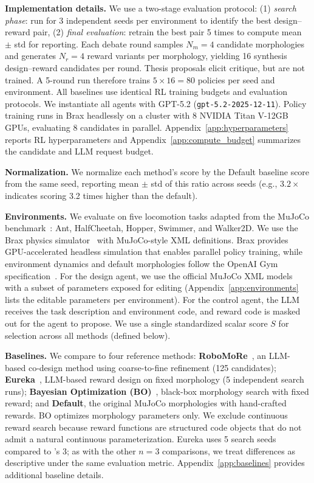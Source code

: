 \textbf{Implementation details.} We use a two-stage evaluation protocol: (1) \emph{search phase}: run \abbrev{} for 3 independent seeds per environment to identify the best design--reward pair, (2) \emph{final evaluation}: retrain the best pair 5 times to compute mean $\pm$ std for reporting. Each debate round samples $N_m{=}4$ candidate morphologies and generates $N_r{=}4$ reward variants per morphology, yielding 16 synthesis design--reward candidates per round. Thesis proposals elicit critique, but are not trained. A 5-round run therefore trains $5 \times 16 = 80$ policies per seed and environment. All baselines use identical RL training budgets and evaluation protocols. We instantiate all agents with GPT-5.2 (\texttt{gpt-5.2-2025-12-11}). Policy training runs in Brax headlessly on a cluster with 8 NVIDIA Titan V-12GB GPUs, evaluating 8 candidates in parallel. Appendix~\ref{app:hyperparameters} reports RL hyperparameters and Appendix~\ref{app:compute_budget} summarizes the candidate and LLM request budget.

\textbf{Normalization.} We normalize each method's score by the Default baseline score from the same seed, reporting mean $\pm$ std of this ratio across seeds (e.g., $3.2\times$ indicates scoring 3.2 times higher than the default).

\textbf{Environments.} We evaluate on five locomotion tasks adapted from the MuJoCo benchmark~\cite{todorov2012mujoco}: Ant, HalfCheetah, Hopper, Swimmer, and Walker2D. We use the Brax physics simulator~\cite{brax2021github} with MuJoCo-style XML definitions. Brax provides GPU-accelerated headless simulation that enables parallel policy training, while environment dynamics and default morphologies follow the OpenAI Gym specification~\cite{brockman2016openai}. For the design agent, we use the official MuJoCo XML models with a subset of parameters exposed for editing (Appendix~\ref{app:environments} lists the editable parameters per environment). For the control agent, the LLM receives the task description and environment code, and reward code is masked out for the agent to propose. We use a single standardized scalar score $S$ for selection across all methods (defined below).

\textbf{Baselines.} We compare \abbrev{} to four reference methods: \textbf{RoboMoRe}~\cite{fang2025robomore}, an LLM-based co-design method using coarse-to-fine refinement (125 candidates); \textbf{Eureka}~\cite{ma2024eureka}, LLM-based reward design on fixed morphology (5 independent search runs); \textbf{Bayesian Optimization (BO)}~\cite{snoek2012practical, shahriari2015taking}, black-box morphology search with fixed reward; and \textbf{Default}, the original MuJoCo morphologies with hand-crafted rewards. BO optimizes morphology parameters only. We exclude continuous reward search because reward functions are structured code objects that do not admit a natural continuous parameterization. Eureka uses 5 search seeds compared to \abbrev{}'s 3; as with the other $n{=}3$ comparisons, we treat differences as descriptive under the same evaluation metric. Appendix~\ref{app:baselines} provides additional baseline details.

